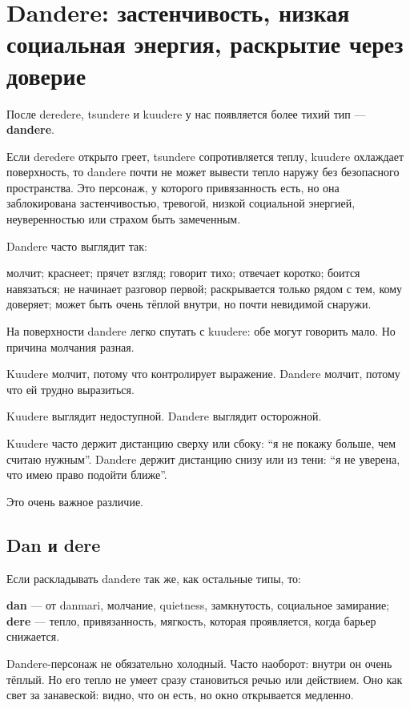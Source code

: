 \section{Dandere: застенчивость, низкая социальная энергия, раскрытие через доверие}

После deredere, tsundere и kuudere у нас появляется более тихий тип ---
\textbf{dandere}.

Если deredere открыто греет, tsundere сопротивляется теплу, kuudere
охлаждает поверхность, то dandere почти не может вывести тепло наружу
без безопасного пространства. Это персонаж, у которого привязанность
есть, но она заблокирована застенчивостью, тревогой, низкой социальной
энергией, неуверенностью или страхом быть замеченным.

Dandere часто выглядит так:

молчит; краснеет; прячет взгляд; говорит тихо; отвечает коротко; боится
навязаться; не начинает разговор первой; раскрывается только рядом с
тем, кому доверяет; может быть очень тёплой внутри, но почти невидимой
снаружи.

На поверхности dandere легко спутать с kuudere: обе могут говорить мало.
Но причина молчания разная.

Kuudere молчит, потому что контролирует выражение. Dandere молчит,
потому что ей трудно выразиться.

Kuudere выглядит недоступной. Dandere выглядит осторожной.

Kuudere часто держит дистанцию сверху или сбоку: ``я не покажу больше,
чем считаю нужным''. Dandere держит дистанцию снизу или из тени: ``я не
уверена, что имею право подойти ближе''.

Это очень важное различие.

\subsection*{Dan и dere}

Если раскладывать dandere так же, как остальные типы, то:

\textbf{dan} --- от danmari, молчание, quietness, замкнутость,
социальное замирание; \textbf{dere} --- тепло, привязанность, мягкость,
которая проявляется, когда барьер снижается.

Dandere-персонаж не обязательно холодный. Часто наоборот: внутри он
очень тёплый. Но его тепло не умеет сразу становиться речью или
действием. Оно как свет за занавеской: видно, что он есть, но окно
открывается медленно.

